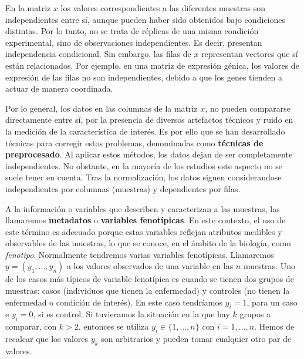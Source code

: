En la matriz $x$ los valores correspondientes a las diferentes muestras son independientes entre sí, aunque pueden
haber sido obtenidos bajo condiciones distintas. Por lo tanto, no se trata de réplicas de una misma condición
experimental, sino de observaciones independientes. Es decir, presentan independencia condicional. Sin embargo, las
filas de $x$ representan vectores que sí están relacionados. Por ejemplo, en una matriz de expresión génica, los 
valores de expresión de las filas no son independientes, debido a que los genes tienden a actuar de manera coordinada. \newline

Por lo general, los datos en las columnas de la matriz $x$, no pueden compararse directamente entre sí, por la presencia
de diversos artefactos técnicos y ruido en la medición de la característica de interés. Es por ello que se han desarrollado
técnicas para corregir estos problemas, denominadas como \textbf{técnicas de preprocesado}. Al aplicar estos métodos, los
datos dejan de ser completamente independientes. No obstante, en la mayoría de los estudios este aspecto no se suele
tener en cuenta. Tras la normalización, los datos siguen considerandose independientes por columnas (muestras) y dependientes
por filas. \newline


A la información o variables que describen y caracterizan a las muestras, las llamaremos \textbf{metadatos} o 
\textbf{variables fenotípicas}. En este contexto, el uso de este término es adecuado porque estas variables reflejan
atributos medibles y observables de las muestras, lo que se conoce, en el ámbito de la biología, como \textit{fenotipo}. 
Normalmente tendremos varias variables fenotípicas. 
Llamaremos $y = (y_{1},...,y_{n})$ a los valores observados de una variable en las $n$ muestras. Uno de los casos más típicos
de variable fenotípica es cuando se tienen dos grupos de muestras: casos (individuos que tienen la enfermedad) y controles
(no tienen la enfermedad o condición de interés). En este caso tendríamos $y_{i} = 1$, para un caso e $y_{i} = 0$, si es control.
Si tuvieramos la situación en la que hay $k$ grupos a comparar, con $k > 2$, entonces se utiliza $y_{i} \in \{1,...,n\}$ 
con $i = 1,...,n$. Hemos de recalcar que los valores $y_{k}$ son arbitrarios y pueden tomar cualquier otro par de valores. \newline




